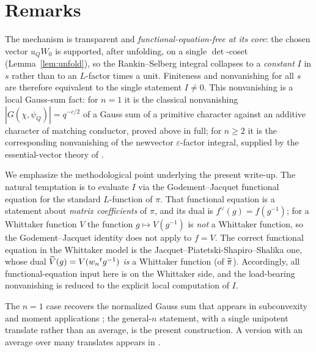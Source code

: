 \section*{Remarks}

The mechanism is transparent and \emph{functional-equation-free at its core}: the chosen vector
$u_Q W_0$ is supported, after unfolding, on a single $\det$-coset
\textup{(}Lemma~\ref{lem:unfold}\textup{)}, so the Rankin--Selberg integral collapses to a
\emph{constant} $I$ in $s$ rather than to an $L$-factor times a unit. Finiteness and nonvanishing
for all $s$ are therefore equivalent to the single statement $I\neq0$. This nonvanishing is a
local Gauss-sum fact: for $n=1$ it is the classical nonvanishing $|G(\chi,\psi_Q)|=q^{-c/2}$ of a
Gauss sum of a primitive character against an additive character of matching conductor, proved
above in full; for $n\ge2$ it is the corresponding nonvanishing of the newvector
$\varepsilon$-factor integral, supplied by the essential-vector theory of \cite{JPSS81,Matringe}.

We emphasize the methodological point underlying the present write-up. The natural temptation is
to evaluate $I$ via the Godement--Jacquet functional equation for the standard $L$-function of
$\pi$. That functional equation is a statement about \emph{matrix coefficients} of $\pi$, and its
dual is $f^\vee(g)=f(g^{-1})$; for a Whittaker function $V$ the function $g\mapsto V(g^{-1})$ is
\emph{not} a Whittaker function, so the Godement--Jacquet identity does not apply to $f=V$. The
correct functional equation in the Whittaker model is the Jacquet--Piatetski-Shapiro--Shalika one,
whose dual $\widetilde{V}(g)=V(w_n{}^{t}g^{-1})$ \emph{is} a Whittaker function \textup{(}of
$\widetilde{\pi}$\textup{)}. Accordingly, all functional-equation input here is on the Whittaker
side, and the load-bearing nonvanishing is reduced to the explicit local computation of $I$.

The $n=1$ case recovers the normalized Gauss sum that appears in subconvexity and moment
applications \cite{Sarnak,MV}; the general-$n$ statement, with a single unipotent translate rather
than an average, is the present construction. A version with an average over many translates
appears in \cite{BKL}.

